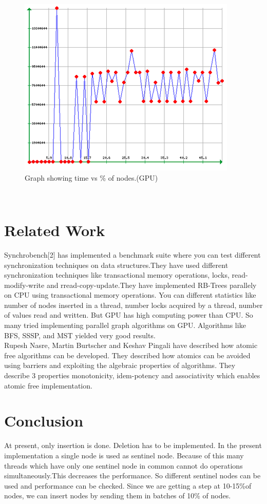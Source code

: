 \documentclass[BTech]{iitmdiss}
\begin{document}
\begin{figure}[h]
    \centering
    \centerline{\includegraphics{rsz_graph_gpu.png}}
    \caption{Graph showing time vs \% of nodes.(GPU)}
    \label{fig:graph_gpu}
\end{figure}\\

\chapter{Related Work}
Synchrobench[2] has implemented a benchmark suite where you can test different synchronization techniques on data structures.They have used different synchronization techniques like transactional memory operations, locks, read-modify-write and rread-copy-update.They have implemented RB-Trees parallely on CPU using transactional memory operations. You can different statistics like number of nodes inserted in a thread, number locks acquired by a thread, number of values read and written. But GPU has high computing power than CPU. So many tried implementing parallel graph algorithms on GPU. Algorithms like BFS, SSSP, and MST yielded very good results.\\ 
Rupesh Nasre, Martin Burtscher and Keshav Pingali have described how atomic free algorithms can be developed. They described how atomics can be avoided using barriers and exploiting the algebraic properties of algorithms. They describe 3 properties monotonicity, idem-potency and associativity which enables atomic free implementation.
\chapter{Conclusion}
At present, only insertion is done. Deletion has to be implemented. In the present implementation a single node is used as sentinel node. Because of this many threads which have only one sentinel node in common cannot do operations simultaneously.This decreases the performance. So different sentinel nodes can be used and performance can be checked. Since we are getting a step at 10-15\%of nodes, we can insert nodes by sending them in batches of 10\% of nodes.
\end{document}
